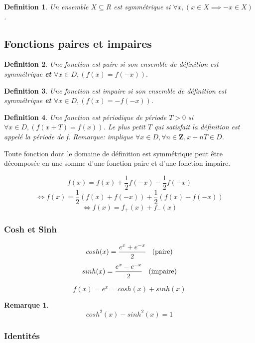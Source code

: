 \documentclass{article}
\newtheorem{definition}{Definition}[section]
\newtheorem{remark}{Remarque}[section]
\begin{document}
\begin{definition}
    Un ensemble $ X \subseteq R $ est symmétrique si $ \forall x, (x \in X \implies -x \in X) $.
\end{definition}

\subsection{Fonctions paires et impaires}
\begin{definition}
    Une fonction est paire si son ensemble de définition est symmétrique \textbf{et} $ \forall x \in D, (f(x) = f(-x)).$
\end{definition}
\begin{definition}
    Une fonction est impaire si son ensemble de définition est symmétrique \textbf{et} $ \forall x \in D, (f(x) = -f(-x)).$
\end{definition}

\begin{definition}
    Une fonction est périodique de période $ T > 0 $ si $ \forall x \in D, (f(x+T) = f(x)) $. Le plus petit $ T $ qui satisfait la définition est appelé la période de f. Remarque: implique $ \forall x \in D, \forall n \in \mathbf{Z}, x + nT \in D$. 
\end{definition}

Toute fonction dont le domaine de définition est symmétrique peut être décomposée en une somme d'une fonction paire et d'une fonction impaire.

\[ f(x) = f(x) + \frac{1}{2} f(-x) - \frac{1}{2} f(-x) \]
\[ \Leftrightarrow f(x) = \frac{1}{2}(f(x) + f(-x)) + \frac{1}{2}(f(x) - f(-x)) \]
\[ \Leftrightarrow f(x) = f_{+}(x) + f_{-}(x) \]

\subsubsection{Cosh et Sinh}

\[ cosh(x) = \frac{e^x + e^{-x}}{2} \hspace{0.3cm} \text{(paire)} \]
\[ sinh(x) = \frac{e^x - e^{-x}}{2} \hspace{0.3cm} \text{(impaire)}\]

\[ f(x) = e^x = cosh(x) + sinh(x) \]
\begin{remark}
    \[ cosh^2(x) - sinh^2(x) = 1 \]
\end{remark}

\subsubsection{Identités}
\end{document}
